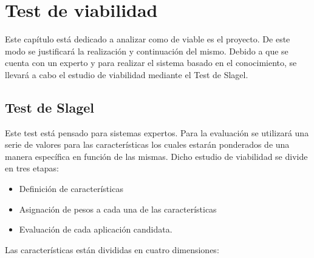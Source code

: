 \chapter{Test de viabilidad}
\label{cap: Introducción y objetivos}

Este capítulo está dedicado a analizar como de viable es el proyecto. De este modo
se justificará la realización y continuación del mismo. Debido a que se cuenta con
un experto y para realizar el sistema basado en el conocimiento, se llevará a cabo
el estudio de viabilidad mediante el Test de Slagel.

\section{Test de Slagel}


Este test está pensado para sistemas expertos. Para la evaluación se utilizará una serie
de valores para las características los cuales estarán ponderados de una manera
específica en función de las mismas. Dicho estudio de viabilidad se divide en tres etapas:

\begin{itemize}
  \item Definición de características
  \item Asignación de pesos a cada una de las características
  \item Evaluación de cada aplicación candidata.
\end{itemize}

Las características están divididas en cuatro dimensiones:

